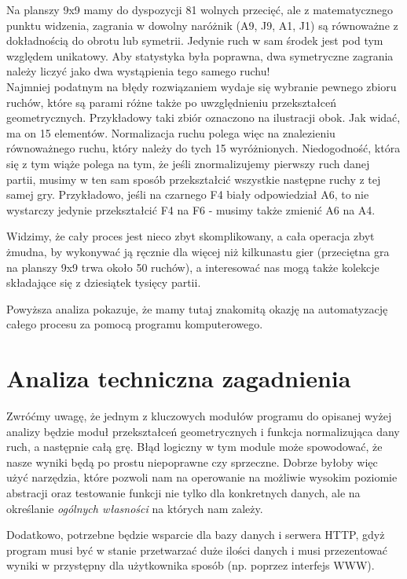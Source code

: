 \documentclass[11pt,leqno]{article}
\begin{document}
Na planszy 9x9 mamy do dyspozycji 81 wolnych przecięć, ale z matematycznego punktu widzenia, zagrania w dowolny naróżnik 
(A9, J9, A1, J1) są równoważne z dokładnością do obrotu lub symetrii. Jedynie ruch w sam środek jest pod tym względem unikatowy. 
Aby statystyka była poprawna, dwa symetryczne zagrania należy liczyć jako dwa wystąpienia tego samego ruchu! \\ 
Najmniej podatnym  na błędy rozwiązaniem wydaje się wybranie pewnego zbioru ruchów, które są parami różne także po uwzględnieniu przekształceń 
geometrycznych. Przykładowy taki zbiór oznaczono na ilustracji obok. Jak widać, ma on 15 elementów. Normalizacja ruchu polega
 więc na znalezieniu równoważnego ruchu, który należy do tych 15 wyróżnionych. Niedogodność, która się z tym wiąże polega na 
tym, że jeśli znormalizujemy pierwszy ruch danej partii, musimy w ten sam sposób przekształcić wszystkie następne ruchy z tej samej gry. 
Przykładowo, jeśli na czarnego F4 biały odpowiedział A6, to nie wystarczy jedynie przekształcić
F4 na F6 - musimy także zmienić A6 na A4.

Widzimy, że cały proces jest nieco zbyt skomplikowany, a cała operacja zbyt żmudna, by wykonywać ją ręcznie dla więcej niż 
kilkunastu gier (przeciętna gra na planszy 9x9 trwa około 50 ruchów), a interesować nas mogą także kolekcje składające się
 z dziesiątek tysięcy partii.

Powyższa analiza pokazuje, że mamy tutaj znakomitą okazję na automatyzację całego procesu za pomocą programu komputerowego. 

\section{Analiza techniczna zagadnienia}

Zwróćmy uwagę, że jednym z kluczowych modułów programu do opisanej wyżej analizy będzie moduł przekształceń geometrycznych i
 funkcja normalizująca dany ruch, a następnie całą grę. Błąd logiczny w tym module może spowodować, że nasze wyniki będą po prostu 
niepoprawne czy sprzeczne. Dobrze byłoby więc użyć narzędzia, które pozwoli nam na operowanie na możliwie wysokim poziomie
 abstracji oraz testowanie funkcji nie tylko dla konkretnych danych, ale na określanie \emph{ogólnych własności} na których nam zależy. 

Dodatkowo, potrzebne będzie wsparcie dla bazy danych i serwera HTTP, gdyż program musi być w stanie przetwarzać duże ilości danych
 i musi przezentować wyniki w przystępny dla użytkownika sposób (np. poprzez interfejs WWW).
\end{document}
